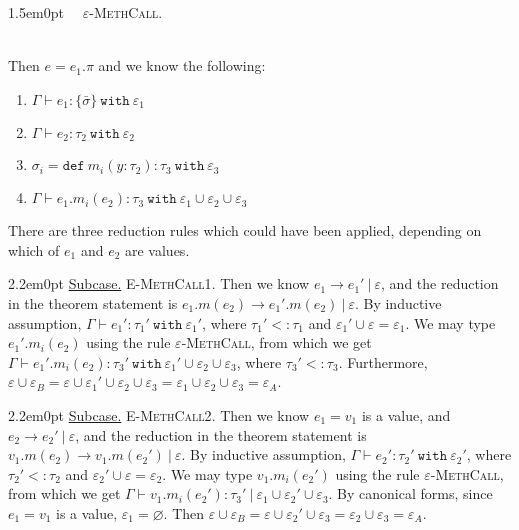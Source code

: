 \documentclass{llncs}
\newcommand{\keywadj}[1]{\mathtt{#1}}
\newcommand{\keyw}[1]{\keywadj{#1}~}
\newcommand{\kw}[1]{\keyw{ #1 }}
\newcommand{\kwa}[1]{\keywadj{ #1 }}
\newcommand{\proofcase}[2]{
	\begin{adjustwidth}{1.5em}{0pt}
		\fbox{Case.}~~#1. \\ ~#2
	\end{adjustwidth}
}
\newcommand{\subcase}[1] {
	\begin{adjustwidth}{2.2em}{0pt}
		\underline{Subcase.} #1
	\end{adjustwidth}
}
\begin{document}
{\proofcase{\textsc{$\varepsilon$-MethCall}}{

\noindent
Then $e = e_1.\pi$ and we know the following:

\begin{enumerate}
	\item $\Gamma \vdash e_1 : \{ \bar \sigma \}~\kw{with} \varepsilon_1$
	\item $\Gamma \vdash e_2 : \tau_2~\kw{with} \varepsilon_2$
	\item $\sigma_i = \kwa{def}~m_i(y : \tau_2): \tau_3~\kw{with} \varepsilon_3$
	\item $\Gamma \vdash e_1.m_i(e_2) : \tau_3~ \kw{with} \varepsilon_1 \cup \varepsilon_2 \cup \varepsilon_3$
\end{enumerate}

\noindent
There are three reduction rules which could have been applied, depending on which of $e_1$ and $e_2$ are values.\\

\subcase{\textsc{E-MethCall1}. Then we know $e_1 \longrightarrow e_1'~|~\varepsilon$, and the reduction in the theorem statement is $e_1.m(e_2) \longrightarrow e_1'.m(e_2)~|~\varepsilon$. By inductive assumption, $\Gamma \vdash e_1' : \tau_1'~\kw{with} \varepsilon_1'$, where $\tau_1' <: \tau_1$ and $\varepsilon_1' \cup \varepsilon = \varepsilon_1$. We may type $e_1'.m_i(e_2)$ using the rule \textsc{$\varepsilon$-MethCall}, from which we get $\Gamma \vdash e_1'.m_i(e_2) : \tau_3'~\kw{with} \varepsilon_1' \cup \varepsilon_2 \cup \varepsilon_3$, where $\tau_3' <: \tau_3$. Furthermore, $\varepsilon \cup \varepsilon_B = \varepsilon \cup \varepsilon_1' \cup \varepsilon_2 \cup \varepsilon_3 = \varepsilon_1 \cup \varepsilon_2 \cup \varepsilon_3 = \varepsilon_A$.\\

}

\subcase{\textsc{E-MethCall2}. Then we know $e_1 = v_1$ is a value, and $e_2 \longrightarrow e_2'~|~\varepsilon$, and the reduction in the theorem statement is $v_1.m(e_2) \longrightarrow v_1.m(e_2')~|~\varepsilon$. By inductive assumption, $\Gamma \vdash e_2' : \tau_2'~\kw{with} \varepsilon_2'$, where $\tau_2' <: \tau_2$ and $\varepsilon_2' \cup \varepsilon = \varepsilon_2$. We may type $v_1.m_i(e_2')$ using the rule \textsc{$\varepsilon$-MethCall}, from which we get $\Gamma \vdash v_1.m_i(e_2') : \tau_3'~|~\varepsilon_1 \cup \varepsilon_2' \cup \varepsilon_3$. By canonical forms, since $e_1 = v_1$ is a value, $\varepsilon_1 = \varnothing$. Then $\varepsilon \cup \varepsilon_B = \varepsilon \cup \varepsilon_2' \cup \varepsilon_3 = \varepsilon_2 \cup \varepsilon_3 = \varepsilon_A$.\\


}}}
\end{document}
